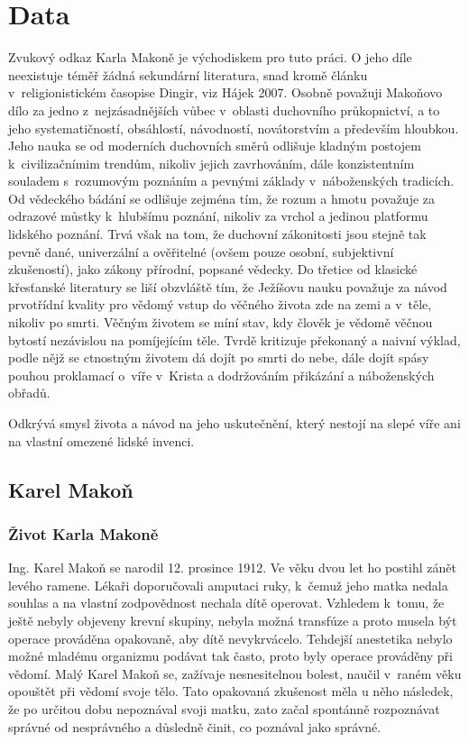 \chapter{Data}
\label{kap:data}

Zvukový odkaz Karla Makoně je východiskem pro tuto práci. O jeho
díle neexistuje téměř žádná sekundární literatura, snad kromě článku
v~religionistickém časopise Dingir, viz Hájek 2007\cite{hajek2007cesky}. Osobně
považuji Makoňovo dílo za jedno z~nejzásadnějších vůbec v~oblasti duchovního
průkopnictví, a to jeho systematičností, obsáhlostí, návodností, novátorstvím a
především hloubkou. Jeho nauka se od moderních duchovních směrů odlišuje kladným
postojem k~civilizačnímim trendům, nikoliv jejich zavrhováním, dále
konzistentním souladem s~rozumovým poznáním a pevnými základy v~náboženských
tradicích. Od vědeckého bádání se odlišuje zejména tím, že rozum a hmotu
považuje za odrazové můstky k~hlubšímu poznání, nikoliv za vrchol a jedinou
platformu lidského poznání. Trvá však na tom, že duchovní zákonitosti jsou
stejně tak pevně dané, univerzální a ověřitelné (ovšem pouze osobní, subjektivní
zkušeností), jako zákony přírodní, popsané vědecky. Do třetice od klasické
křesťanské literatury se liší obzvláště tím, že Ježíšovu nauku považuje za návod
prvotřídní kvality pro vědomý vstup do věčného života zde na zemi a v~těle,
nikoliv po smrti. Věčným životem se míní stav, kdy člověk je vědomě věčnou
bytostí nezávislou na pomíjejícím těle. Tvrdě kritizuje překonaný a naivní
výklad, podle nějž se ctnostným životem dá dojít po smrti do nebe, dále dojít
spásy pouhou proklamací o~víře v~Krista a dodržováním přikázání a náboženských
obřadů.

Odkrývá smysl života a návod na jeho uskutečnění, který nestojí na slepé víře
ani na vlastní omezené lidské invenci.

\section{Karel Makoň}

\subsection{Život Karla Makoně}

Ing. Karel Makoň se narodil 12. prosince 1912. Ve věku dvou let ho postihl zánět
levého ramene. Lékaři doporučovali amputaci ruky, k~čemuž jeho matka nedala
souhlas a na vlastní zodpovědnost nechala dítě operovat. Vzhledem k~tomu, že
ještě nebyly objeveny krevní skupiny, nebyla možná transfúze a proto musela být
operace prováděna opakovaně, aby dítě nevykrvácelo. Tehdejší anestetika nebylo
možné mladému organizmu podávat tak často, proto byly operace prováděny při
vědomí. Malý Karel Makoň se, zažívaje nesnesitelnou bolest, naučil v~raném věku
opouštět při vědomí svoje tělo. Tato opakovaná zkušenost měla u něho následek, že po
určitou dobu nepoznával svoji matku, zato začal spontánně rozpoznávat správné od
nesprávného a důsledně činit, co poznával jako správné.


